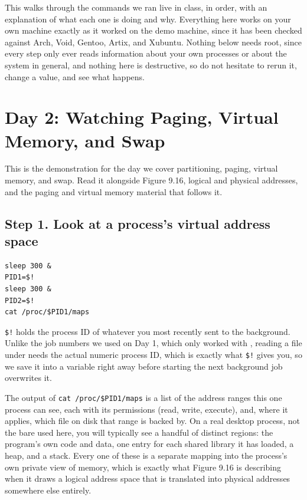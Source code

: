\documentclass[11pt]{article}
\begin{document}

\noindent
This walks through the commands we ran live in class, in order, with an explanation of what each one is doing and why. Everything here works on your own machine exactly as it worked on the demo machine, since it has been checked against Arch, Void, Gentoo, Artix, and Xubuntu. Nothing below needs root, since every step only ever reads information about your own processes or about the system in general, and nothing here is destructive, so do not hesitate to rerun it, change a value, and see what happens.


\section{Day 2: Watching Paging, Virtual Memory, and Swap}

This is the demonstration for the day we cover partitioning, paging, virtual memory, and swap. Read it alongside Figure 9.16, logical and physical addresses, and the paging and virtual memory material that follows it.

\subsection*{Step 1. Look at a process's virtual address space}

\begin{lstlisting}
sleep 300 &
PID1=$!
sleep 300 &
PID2=$!
cat /proc/$PID1/maps
\end{lstlisting}

\texttt{\$!} holds the process ID of whatever you most recently sent to the background. Unlike the job numbers we used on Day 1, which only worked with , reading a file under  needs the actual numeric process ID, which is exactly what \texttt{\$!} gives you, so we save it into a variable right away before starting the next background job overwrites it.

The output of \texttt{cat /proc/\$PID1/maps} is a list of the address ranges this one process can see, each with its permissions (read, write, execute), and, where it applies, which file on disk that range is backed by. On a real desktop process, not the bare  used here, you will typically see a handful of distinct regions: the program's own code and data, one entry for each shared library it has loaded, a heap, and a stack. Every one of these is a separate mapping into the process's own private view of memory, which is exactly what Figure 9.16 is describing when it draws a logical address space that is translated into physical addresses somewhere else entirely.
\end{document}
